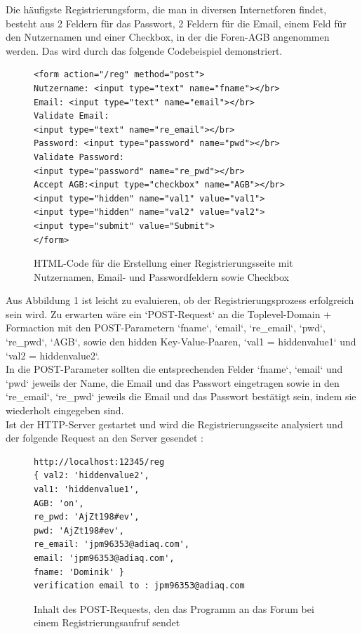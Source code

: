 Die häufigste Registrierungsform, die man in diversen Internetforen findet, besteht aus 2 Feldern für das Passwort, 2 Feldern für die Email, einem Feld für den Nutzernamen und einer Checkbox, in der die Foren-AGB angenommen werden. Das wird durch das folgende Codebeispiel demonstriert.


\begin{figure}[h!]
\begin{lstlisting}[language=HTML5]
<form action="/reg" method="post">
Nutzername: <input type="text" name="fname"></br>
Email: <input type="text" name="email"></br>
Validate Email: 
<input type="text" name="re_email"></br>
Password: <input type="password" name="pwd"></br>
Validate Password: 
<input type="password" name="re_pwd"></br>
Accept AGB:<input type="checkbox" name="AGB"></br>
<input type="hidden" name="val1" value="val1">
<input type="hidden" name="val2" value="val2">
<input type="submit" value="Submit">
</form>
\end{lstlisting}
\caption{HTML-Code für die Erstellung einer Registrierungsseite mit Nutzernamen, Email- und Passwordfeldern sowie Checkbox}
\end{figure}
\newpage
Aus Abbildung 1 ist leicht zu evaluieren, ob der Registrierungsprozess erfolgreich sein wird. Zu erwarten wäre ein `POST-Request` an die Toplevel-Domain + Formaction mit den POST-Parametern `fname`, `email`, `re\_email`, `pwd`, `re\_pwd`, `AGB`, sowie den hidden Key-Value-Paaren, `val1 = hiddenvalue1` und `val2 = hiddenvalue2`.\\
In die POST-Parameter sollten die entsprechenden Felder `fname`, `email` und `pwd` jeweils der Name, die Email und das Passwort eingetragen sowie in den `re\_email`, `re\_pwd` jeweils die Email und das Passwort bestätigt sein, indem sie wiederholt eingegeben sind.\\
Ist der HTTP-Server gestartet und wird die Registrierungsseite analysiert und der folgende Request an den Server gesendet :

\begin{figure}[ht]
\begin{lstlisting}[language=HTML5]
http://localhost:12345/reg
{ val2: 'hiddenvalue2',
val1: 'hiddenvalue1',
AGB: 'on',
re_pwd: 'AjZt198#ev',
pwd: 'AjZt198#ev',
re_email: 'jpm96353@adiaq.com',
email: 'jpm96353@adiaq.com',
fname: 'Dominik' }
verification email to : jpm96353@adiaq.com
\end{lstlisting}
\caption{Inhalt des POST-Requests, den das Programm an das Forum bei einem Registrierungsaufruf sendet}
\end{figure}

